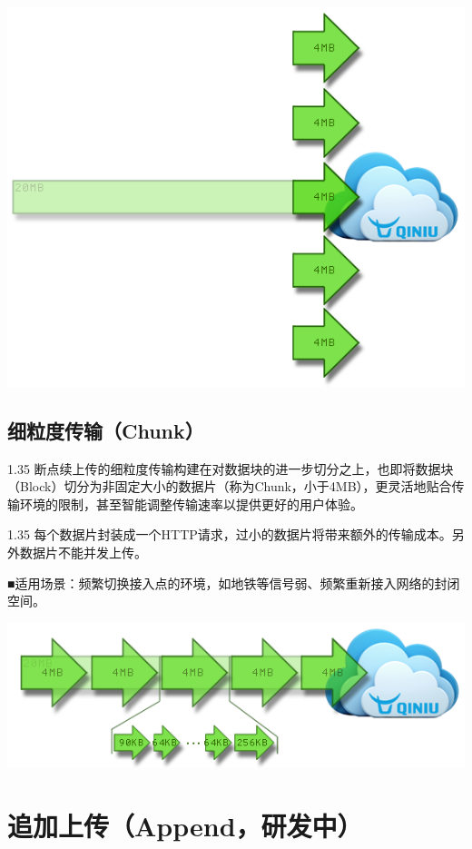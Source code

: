 \documentclass[11pt, oneside]{book}
\newcommand{\qpara}[1]{
\vspace{0.2em}
\begin{spacing}{1.35}
\noindent
#1\par
\end{spacing}
\vspace{0.2em}
}
\newcommand{\qblock}[1]{
\vspace{0.1em}
\noindent
#1\par
\vspace{0.1em}
}
\begin{document}
\begin{center}
\includegraphics[scale=1]{../pics/upload/one_rputl.png}
\end{center}

\subsection{细粒度传输（Chunk）}

\qpara{断点续上传的细粒度传输构建在对数据块的进一步切分之上，也即将数据块（Block）切分为非固定大小的数据片（称为Chunk，小于4MB），更灵活地贴合传输环境的限制，甚至智能调整传输速率以提供更好的用户体验。}
\qpara{每个数据片封装成一个HTTP请求，过小的数据片将带来额外的传输成本。另外数据片不能并发上传。}
\qblock{■\thinspace 适用场景：频繁切换接入点的环境，如地铁等信号弱、频繁重新接入网络的封闭空间。}

\begin{center}
\includegraphics[scale=1]{../pics/upload/one_rput_chunk.png}
\end{center}

\section{追加上传（Append，研发中）}
\end{document}
